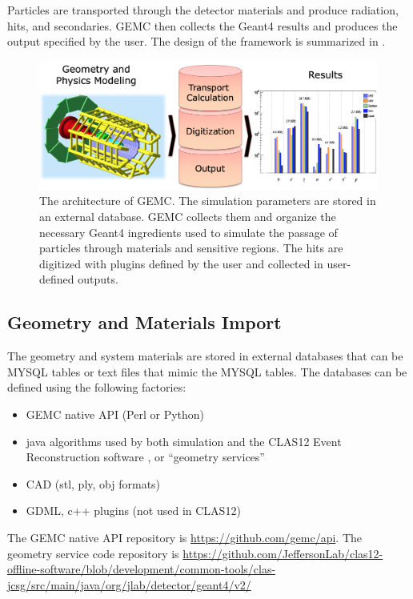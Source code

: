 Particles are transported through the detector materials and produce radiation, hits, and secondaries.
GEMC then collects the Geant4 results and produces the output specified by the user.
The design of the framework is summarized in .

\begin{figure}
	\centering
	\includegraphics[width=1.0\columnwidth,keepaspectratio]{img/gemcDesign.png}
	\caption{The architecture of GEMC. The simulation parameters are stored in an external database. GEMC collects
             them and organize the necessary Geant4 ingredients used to simulate the
             passage of particles through materials and sensitive regions. The hits are digitized with
             plugins defined by the user and collected in user-defined outputs.  }
	\label{fig:gemcDesign}
\end{figure}



\subsection{Geometry and Materials Import}

The geometry and system materials are stored in external databases that can be MYSQL tables or text files that mimic the MYSQL tables.
The databases can be defined using the following factories:

\begin{itemize}
	\item GEMC native API (Perl or Python)
	\item java algorithms used by both simulation and the CLAS12 Event Reconstruction software \cite{reco2019}, or ``geometry services''
	\item CAD (stl, ply, obj formats)
	\item GDML, c++ plugins (not used in CLAS12)
\end{itemize}

The GEMC native API repository is \url{https://github.com/gemc/api}. The geometry service code repository is
\url{https://github.com/JeffersonLab/clas12-offline-software/blob/development/common-tools/clas-jcsg/src/main/java/org/jlab/detector/geant4/v2/}


